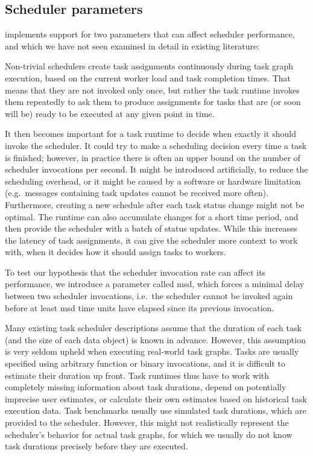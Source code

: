 \subsection{Scheduler parameters}
\estee{} implements support for two parameters that can affect scheduler
performance, and which we have not seen examined in detail in existing literature:
\begin{description}[wide=0pt]
	\item[\glsxtrlong{msd}] Non-trivial schedulers create task assignments continuously during task graph execution, based on
		the current worker load and task completion times. That means that they are not invoked only once,
		but rather the task runtime invokes them repeatedly to ask them to produce assignments for tasks
		that are (or soon will be) ready to be executed at any given point in time.

		It then becomes important for a task runtime to decide when exactly it should invoke the scheduler.
		It could try to make a scheduling decision every time a task is finished; however, in practice
		there is often an upper bound on the number of scheduler invocations per second. It might be
		introduced artificially, to reduce the scheduling overhead, or it might be caused by a software or
		hardware limitation (e.g.\ messages containing task updates cannot be received more often).
		Furthermore, creating a new schedule after each task status change might not be optimal. The
		runtime can also accumulate changes for a short time period, and then provide the scheduler with a
		batch of status updates. While this increases the latency of task assignments, it can give the
		scheduler more context to work with, when it decides how it should assign tasks to workers.

		To test our hypothesis that the scheduler invocation rate can affect its performance, we introduce
		a parameter called \gls{msd}, which forces a minimal delay between two scheduler
		invocations, i.e.\ the scheduler cannot be invoked again before at least \gls{msd}
		time units have elapsed since its previous invocation.
	\item[Information mode] Many existing task scheduler descriptions assume that the duration of each task (and the size of
		each data object) is known in advance. However, this assumption is very seldom upheld when
		executing real-world task graphs. Tasks are usually specified using arbitrary function or binary
		invocations, and it is difficult to estimate their duration up front. Task runtimes thus have to
		work with completely missing information about task durations, depend on potentially imprecise user
		estimates, or calculate their own estimates based on historical task execution data. Task
		benchmarks usually use simulated task durations, which are provided to the scheduler. However, this
		might not realistically represent the scheduler's behavior for actual task graphs, for which we
		usually do not know task durations precisely before they are executed.


\end{description}
